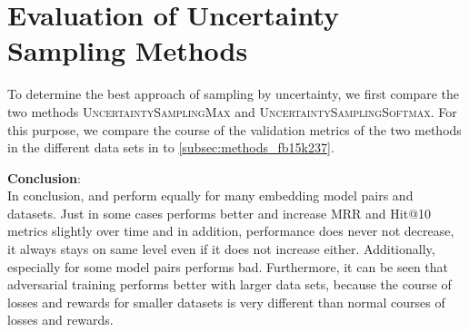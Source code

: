 \section{Evaluation of Uncertainty Sampling Methods}
\label{ch:evaluation:sec:evaluation_methods}

To determine the best approach of sampling by uncertainty, we first compare the two methods \textsc{UncertaintySamplingMax} and \textsc{UncertaintySamplingSoftmax}.
For this purpose, we compare the course of the validation metrics of the two methods in the different data sets in  to \ref{subsec:methods_fb15k237}.









\textbf{Conclusion}:\\
In conclusion, \usmax and \ussoftmax perform equally for many embedding model pairs and datasets.
Just in some cases \ussoftmax performs better and increase MRR and Hit@10 metrics slightly over time and in addition, performance does never not decrease, it always stays on same level even if it does not increase either.
Additionally, especially for some model pairs \usmax performs bad.
Furthermore, it can be seen that adversarial training performs better with larger data sets, because the course of losses and rewards for smaller datasets is very different than normal courses of losses and rewards.



